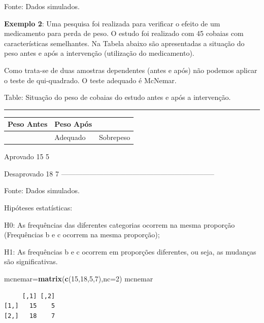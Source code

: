 \documentclass[12pt,brazil,]{book}
\newenvironment{Shaded}{\begin{snugshade}}{\end{snugshade}}
\newcommand{\DataTypeTok}[1]{\textcolor[rgb]{0.13,0.29,0.53}{#1}}
\newcommand{\DecValTok}[1]{\textcolor[rgb]{0.00,0.00,0.81}{#1}}
\newcommand{\KeywordTok}[1]{\textcolor[rgb]{0.13,0.29,0.53}{\textbf{#1}}}
\newcommand{\NormalTok}[1]{#1}
\newcommand{\OperatorTok}[1]{\textcolor[rgb]{0.81,0.36,0.00}{\textbf{#1}}}
\begin{document}
Fonte: Dados simulados.

\textbf{Exemplo 2}: Uma pesquisa foi realizada para verificar o efeito
de um medicamento para perda de peso. O estudo foi realizado com 45
cobaias com características semelhantes. Na Tabela abaixo são
apresentadas a situação do peso antes e após a intervenção (utilização
do medicamento).

Como trata-se de duas amostras dependentes (antes e após) não podemos
aplicar o teste de qui-quadrado. O teste adequado é McNemar.

Table: \label{tab:tamprop}Situação do peso de cobaias do estudo antes e após
a intervenção.

\begin{center}\rule{0.5\linewidth}{\linethickness}\end{center}

\begin{longtable}[]{@{}lll@{}}
\toprule
\textbf{Peso Antes} & \textbf{Peso Após} &\tabularnewline
\midrule
\endhead
& Adequado & Sobrepeso\tabularnewline
\bottomrule
\end{longtable}

Aprovado 15 5

Desaprovado 18 7
-----------------------------------------------------------------

Fonte: Dados simulados.

Hipóteses estatísticas:

H0: As frequências das diferentes categorias ocorrem na mesma proporção
(Frequências b e c ocorrem na mesma proporção);

H1: As frequências b e c ocorrem em proporções diferentes, ou seja, as
mudanças são significativas.

\begin{Shaded}
\begin{Highlighting}[]
\NormalTok{mcnemar=}\KeywordTok{matrix}\NormalTok{(}\KeywordTok{c}\NormalTok{(}\DecValTok{15}\NormalTok{,}\DecValTok{18}\NormalTok{,}\DecValTok{5}\NormalTok{,}\DecValTok{7}\NormalTok{),}\DataTypeTok{nc=}\DecValTok{2}\NormalTok{)}
\NormalTok{mcnemar}
\end{Highlighting}
\end{Shaded}

\begin{verbatim}
     [,1] [,2]
[1,]   15    5
[2,]   18    7
\end{verbatim}

\begin{Shaded}
\end{Shaded}
\end{document}
